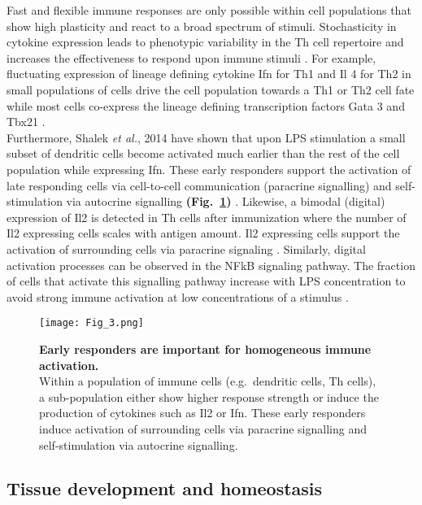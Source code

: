 Fast and flexible immune responses are only possible within cell populations that show high plasticity and react to a broad spectrum of stimuli. Stochasticity in cytokine expression leads to phenotypic variability in the \Gls{Th} cell repertoire and increases the effectiveness to respond upon immune stimuli \citep{Schrom2017}. For example, fluctuating expression of lineage defining cytokine \gls{Ifn}\textgamma{} for Th1 and \gls{Il} 4 for Th2 in small populations of cells drive the cell population towards a Th1 or Th2 cell fate while most cells co-express the lineage defining transcription factors \Gls{Gata} 3 and \Gls{Tbx21} \citep{Fang2013a, Antebi2013}.\\

Furthermore, Shalek \textit{et al.}, 2014 have shown that upon \gls{LPS} stimulation a small subset of dendritic cells become activated much earlier than the rest of the cell population while expressing \gls{Ifn}\textbeta. These early responders support the activation of late responding cells via cell-to-cell communication (paracrine signalling) and self-stimulation via autocrine signalling \textbf{(Fig.~\ref{fig0:noise_immune})} \citep{Shalek2014}. Likewise, a bimodal (digital) expression of Il2 is detected in \gls{Th} cells after immunization where the number of Il2 expressing cells scales with antigen amount. Il2 expressing cells support the activation of surrounding cells via paracrine signaling \citep{Fuhrmann2016}. Similarly, digital activation processes can be observed in the \gls{NFkB} signaling pathway. The fraction of cells that activate this signalling pathway increase with LPS concentration to avoid strong immune activation at low concentrations of a stimulus \citep{Kellogg2015b}.

\begin{figure}[!h]
\centering
\texttt{[image: Fig\_3.png]}
\caption[Early responders are important for homogeneous immune activation]{\textbf{Early responders are important for homogeneous immune activation.}\\
Within a population of immune cells (e.g.~dendritic cells, \gls{Th} cells), a sub-population either show higher response strength or induce the production of cytokines such as Il2 or \gls{Ifn}\textbeta. These early responders induce activation of surrounding cells via paracrine signalling and self-stimulation via autocrine signalling.}
\label{fig0:noise_immune}
\end{figure}

\subsection{Tissue development and homeostasis}

